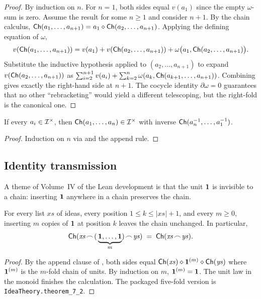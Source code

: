\begin{proof}
By induction on $n$. For $n=1$, both sides equal $v(a_1)$ since the
empty $\omega$-sum is zero. Assume the result for some $n\ge 1$ and
consider $n+1$. By the chain calculus,
$\mathsf{Ch}(a_1,\dots,a_{n+1}) = a_1\mathbin{\diamond}\mathsf{Ch}(a_2,\dots,a_{n+1})$.
Applying the defining equation of $\omega$,
\[
v(\mathsf{Ch}(a_1,\dots,a_{n+1}))
= v(a_1) + v(\mathsf{Ch}(a_2,\dots,a_{n+1})) + \omega\bigl(a_1,
  \mathsf{Ch}(a_2,\dots,a_{n+1})\bigr).
\]
Substitute the inductive hypothesis applied to $(a_2,\dots,a_{n+1})$ to
expand $v(\mathsf{Ch}(a_2,\dots,a_{n+1}))$ as $\sum_{i=2}^{n+1}v(a_i) +
\sum_{k=2}^{n}\omega(a_k,\mathsf{Ch}(a_{k+1},\dots,a_{n+1}))$. Combining
gives exactly the right-hand side at $n+1$. The cocycle identity
$\partial\omega = 0$ guarantees that no other ``rebracketing'' would
yield a different telescoping, but the right-fold is the canonical
one.
\end{proof}

\begin{corollary}\label{cor:chain-inverse}
If every $a_i\in\mathcal{I}^{\times}$, then $\mathsf{Ch}(a_1,\dots,a_n)\in
\mathcal{I}^{\times}$ with inverse $\mathsf{Ch}(a_n^{-1},\dots,a_1^{-1})$.
\end{corollary}

\begin{proof}
Induction on $n$ via  and the append rule.
\end{proof}

\subsection*{Identity transmission}

A theme of Volume~IV of the Lean development is that the unit $\mathbf{1}$
is invisible to a chain: inserting $\mathbf{1}$ anywhere in a chain
preserves the chain.

\begin{theorem}\label{thm:id-transmission}
For every list $\mathit{xs}$ of ideas, every position
$1\le k\le \lvert\mathit{xs}\rvert+1$, and every $m\ge 0$, inserting $m$
copies of $\mathbf{1}$ at position $k$ leaves the chain unchanged. In
particular,
\[
  \mathsf{Ch}(\mathit{xs}\!\frown\!(\,\underbrace{\mathbf{1},\dots,\mathbf{1}}_{m})\!\frown\!
         \mathit{ys})
  \;=\;
  \mathsf{Ch}(\mathit{xs}\!\frown\!\mathit{ys}).
\]
\end{theorem}

\begin{proof}
By the append clause of , both sides equal
$\mathsf{Ch}(\mathit{xs})\mathbin{\diamond} \mathbf{1}^{(m)}\mathbin{\diamond} \mathsf{Ch}(\mathit{ys})$
where $\mathbf{1}^{(m)}$ is the $m$-fold chain of units. By induction on
$m$, $\mathbf{1}^{(m)} = \mathbf{1}$. The unit law in the monoid finishes the
calculation. The packaged five-fold version is
\texttt{IdeaTheory.theorem\_7\_2}.
\end{proof}

